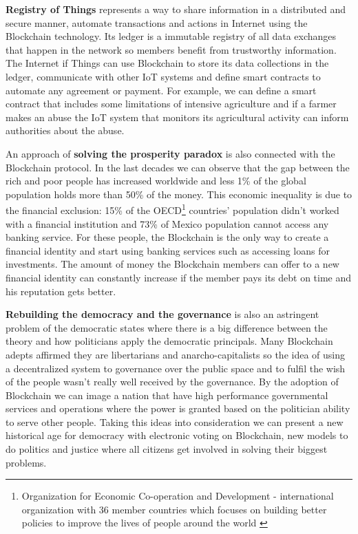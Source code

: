 \textbf{Registry of Things} represents a way to share information in a distributed and secure manner, automate transactions and actions in Internet using the Blockchain technology. Its ledger is a immutable registry of all data exchanges that happen in the network so members benefit from trustworthy information. The Internet if Things can use Blockchain to store its data collections in the ledger, communicate with other IoT systems and define smart contracts to automate any agreement or payment. For example, we can define a smart contract that includes some limitations of intensive agriculture and if a farmer makes an abuse the IoT system that monitors its agricultural activity can inform authorities about the abuse.

An approach of \textbf{solving the prosperity paradox} is also connected with the Blockchain protocol. In the last decades we can observe that the gap between the rich and poor people has increased worldwide and less 1\% of the global population holds more than 50\% of the money. This economic inequality is due to the financial exclusion: 15\% of the OECD\footnote{Organization for Economic Co-operation and Development - international organization  with 36 member countries which focuses on building better policies to improve the lives of people around the world \cite{oecd}} countries' population didn't worked with a financial institution and 73\% of Mexico population cannot access any banking service. For these people, the Blockchain is the only way to create a financial identity and start using banking services such as accessing loans for investments. The amount of money the Blockchain members can offer to a new financial identity can constantly increase if the member pays its debt on time and his reputation gets better.

\textbf{Rebuilding the democracy and the governance} is also an astringent problem of the democratic states where there is a big difference between the theory and how politicians apply the democratic principals. Many Blockchain adepts affirmed they are libertarians and anarcho-capitalists so the idea of using a decentralized system to governance over the public space and to fulfil the wish of the people wasn't really well received by the governance. By the adoption of Blockchain we can image a nation that have high performance governmental services and operations where the power is granted based on the politician ability to serve other people. Taking this ideas into consideration we can present a new historical age for democracy with electronic voting on Blockchain, new models to do politics and justice where all citizens get involved in solving their biggest problems.

